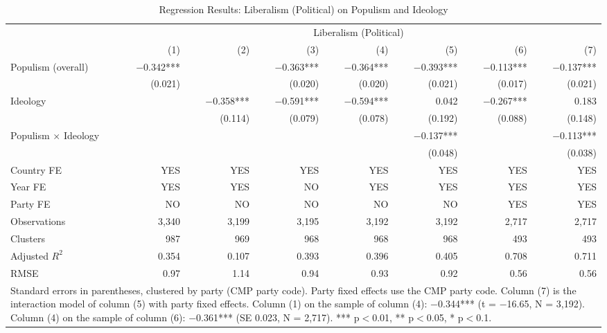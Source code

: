\begin{table}
\caption{Regression Results: Liberalism (Political) on Populism and Ideology}
\label{tab:5}
\scriptsize\setlength{\tabcolsep}{4pt}
\centering
\begin{tabular}{lrrrrrrr}
\toprule
 & \multicolumn{7}{c}{Liberalism (Political)} \\
 & (1) & (2) & (3) & (4) & (5) & (6) & (7) \\
 \midrule
Populism (overall) & $-$0.342*** &  & $-$0.363*** & $-$0.364*** & $-$0.393*** & $-$0.113*** & $-$0.137*** \\
& (0.021) &  & (0.020) & (0.020) & (0.021) & (0.017) & (0.021) \\
Ideology &  & $-$0.358*** & $-$0.591*** & $-$0.594*** & 0.042 & $-$0.267*** & 0.183 \\
&  & (0.114) & (0.079) & (0.078) & (0.192) & (0.088) & (0.148) \\
Populism $\times$ Ideology &  &  &  &  & $-$0.137*** &  & $-$0.113*** \\
&  &  &  &  & (0.048) &  & (0.038) \\
\midrule
Country FE & YES & YES & YES & YES & YES & YES & YES\\
Year FE & YES & YES & NO & YES & YES & YES & YES\\
Party FE & NO & NO & NO & NO & NO & YES & YES\\
Observations & 3,340 & 3,199 & 3,195 & 3,192 & 3,192 & 2,717 & 2,717 \\
Clusters & 987 & 969 & 968 & 968 & 968 & 493 & 493 \\
Adjusted $R^2$ & 0.354 & 0.107 & 0.393 & 0.396 & 0.405 & 0.708 & 0.711 \\
RMSE & 0.97 & 1.14 & 0.94 & 0.93 & 0.92 & 0.56 & 0.56 \\
\bottomrule
\multicolumn{8}{p{0.9\linewidth}}{\scriptsize Standard errors in parentheses, clustered by party (CMP party code). Party fixed effects use the CMP party code. Column (7) is the interaction model of column (5) with party fixed effects. Column (1) on the sample of column (4): $-$0.344*** (t = $-$16.65, N = 3,192). Column (4) on the sample of column (6): $-$0.361*** (SE 0.023, N = 2,717). *** p$<$0.01, ** p$<$0.05, * p$<$0.1.} \\
\end{tabular}
\end{table}
